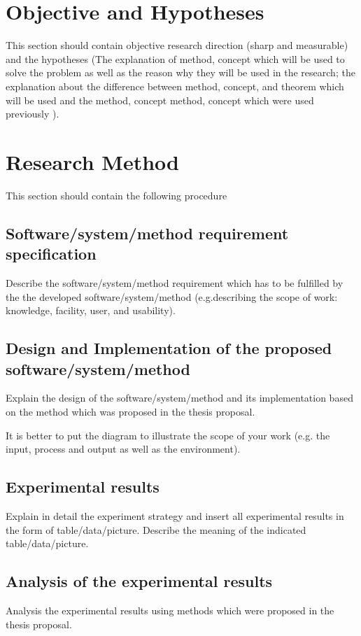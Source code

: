 \documentclass{ittelkom}
\begin{document}
\section{Objective and Hypotheses}

This section should contain objective research direction (sharp and measurable)
and the hypotheses (The explanation of method, concept which will be used to
solve the problem as well as the reason why they will be used in the research;
the explanation about the difference between method, concept, and theorem which
will be used and the method, concept method, concept which were used previously
).

\section{Research Method}

This section should contain the following procedure

\subsection{Software/system/method requirement specification }
Describe the software/system/method requirement which has to be fulfilled by
the the developed software/system/method (e.g.describing the scope of work:
knowledge, facility, user, and usability).

\subsection{Design and Implementation of the proposed software/system/method }
Explain the design of the software/system/method and its implementation based
on the method which was proposed in the thesis proposal.

It is better to put the diagram to illustrate the scope of your work (e.g. the
input, process and output as well as the environment).

\subsection{Experimental results }
Explain in detail the experiment strategy and insert all experimental results
in the form of table/data/picture. Describe the meaning of the indicated
table/data/picture.

\subsection{Analysis of the experimental results}
Analysis the experimental results using methods which were proposed in the
thesis proposal.
\end{document}
